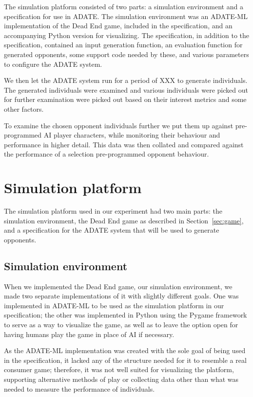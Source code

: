 The simulation platform consisted of two parts: a simulation environment and a
specification for use in ADATE. The simulation environment was an ADATE-ML
implementation of the Dead End game, included in the specification, and an
accompanying Python version for visualizing. The specification, in addition to
the specification, contained an input generation function, an evaluation
function for generated opponents, some support code needed by these, and various
parameters to configure the ADATE system.

We then let the ADATE system run for a period of XXX
to generate individuals. The generated individuals were examined and various
individuals were picked out for further examination were picked out based on
their interest metrics and some other factors.

To examine the chosen opponent individuals further we put them up against pre-
programmed AI player characters, while monitoring their behaviour and
performance in higher detail. This data was then collated and compared against
the performance of a selection pre-programmed opponent behaviour.

\section{Simulation platform}
\label{sec:sim-platform}

The simulation platform used in our experiment had two main parts: the
simulation environment, the Dead End game as described in
Section~\ref{sec:game}, and a specification for the ADATE system that will be
used to generate opponents.

\subsection{Simulation environment}
\label{sec:sim-environment}

When we implemented the Dead End game, our simulation environment, we made two
separate implementations of it with slightly different goals. One was
implemented in ADATE-ML to be used as the simulation platform in our
specification; the other was implemented in Python using the Pygame framework
\citep{pygame} to serve as a way to visualize the game, as well as to leave the
option open for having humans play the game in place of AI if necessary.

As the ADATE-ML implementation was created with the sole goal of being used in
the specification, it lacked any of the structure needed for it to resemble a
real consumer game; therefore, it was not well suited for visualizing the
platform, supporting alternative methods of play or collecting data other than
what was needed to measure the performance of individuals.

